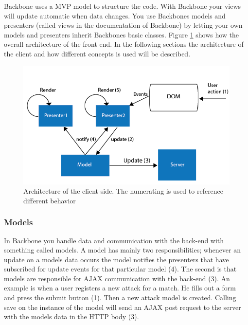 Backbone uses a \ac{MVP} model to structure the code. With Backbone your views will update automatic when data changes. You use Backbones models and presenters (called views in the documentation of Backbone) by letting your own models and presenters inherit Backbones basic classes. Figure \ref{fig:backbone_architecture} shows how the overall architecture of the front-end. In the following sections the architecture of the client and how different concepts is used will be described. 


\begin{figure}[ht!]
\centering
\includegraphics[width=1\textwidth]{images/architecture/backbone_architecture.png}
\caption{Architecture of the client side. The numerating is used to reference different behavior}
\label{fig:backbone_architecture}
\end{figure}

\subsubsection{Models}

In Backbone you handle data and communication with the back-end with something called models. A model has mainly two responsibilities; whenever an update on a models data occurs the model notifies the presenters that have subscribed for update events for that particular model (4). The second is that models are responsible for \ac{AJAX} communication with the back-end (3). An example is when a user registers a new attack for a match. He fills out a form and press the submit button (1). Then a new attack model is created. Calling save on the instance of the model will send an \ac{AJAX} post request to the server with the models data in the \ac{HTTP} body (3).

